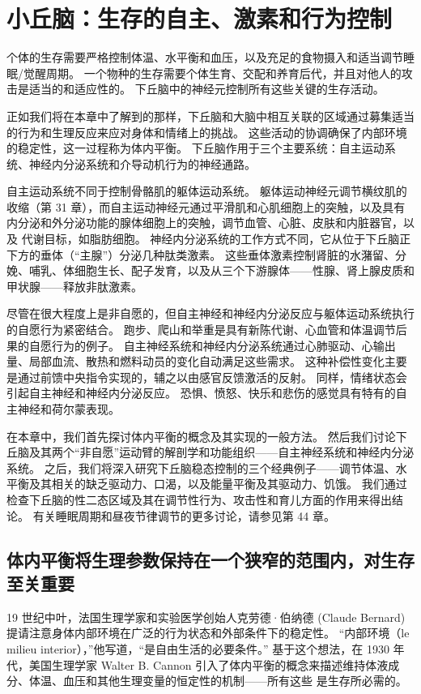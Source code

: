 \chapter{小丘脑：生存的自主、激素和行为控制} \label{chap:chap41}
个体的生存需要严格控制体温、水平衡和血压，以及充足的食物摄入和适当调节睡眠/觉醒周期。 一个物种的生存需要个体生育、交配和养育后代，并且对他人的攻击是适当的和适应性的。 下丘脑中的神经元控制所有这些关键的生存活动。

正如我们将在本章中了解到的那样，下丘脑和大脑中相互关联的区域通过募集适当的行为和生理反应来应对身体和情绪上的挑战。 这些活动的协调确保了内部环境的稳定性，这一过程称为体内平衡。 下丘脑作用于三个主要系统：自主运动系统、神经内分泌系统和介导动机行为的神经通路。

自主运动系统不同于控制骨骼肌的躯体运动系统。 躯体运动神经元调节横纹肌的收缩（第 31 章），而自主运动神经元通过平滑肌和心肌细胞上的突触，以及具有内分泌和外分泌功能的腺体细胞上的突触，调节血管、心脏、皮肤和内脏器官，以及 代谢目标，如脂肪细胞。 神经内分泌系统的工作方式不同，它从位于下丘脑正下方的垂体（“主腺”）分泌几种肽类激素。 这些垂体激素控制肾脏的水潴留、分娩、哺乳、体细胞生长、配子发育，以及从三个下游腺体——性腺、肾上腺皮质和甲状腺——释放非肽激素。

尽管在很大程度上是非自愿的，但自主神经和神经内分泌反应与躯体运动系统执行的自愿行为紧密结合。 跑步、爬山和举重是具有新陈代谢、心血管和体温调节后果的自愿行为的例子。 自主神经系统和神经内分泌系统通过心肺驱动、心输出量、局部血流、散热和燃料动员的变化自动满足这些需求。 这种补偿性变化主要是通过前馈中央指令实现的，辅之以由感官反馈激活的反射。 同样，情绪状态会引起自主神经和神经内分泌反应。 恐惧、愤怒、快乐和悲伤的感觉具有特有的自主神经和荷尔蒙表现。

在本章中，我们首先探讨体内平衡的概念及其实现的一般方法。 然后我们讨论下丘脑及其两个“非自愿”运动臂的解剖学和功能组织——自主神经系统和神经内分泌系统。 之后，我们将深入研究下丘脑稳态控制的三个经典例子——调节体温、水平衡及其相关的缺乏驱动力、口渴，以及能量平衡及其驱动力、饥饿。 我们通过检查下丘脑的性二态区域及其在调节性行为、攻击性和育儿方面的作用来得出结论。 有关睡眠周期和昼夜节律调节的更多讨论，请参见第 44 章。

\section{体内平衡将生理参数保持在一个狭窄的范围内，对生存至关重要}

19 世纪中叶，法国生理学家和实验医学创始人克劳德·伯纳德 (Claude Bernard) 提请注意身体内部环境在广泛的行为状态和外部条件下的稳定性。 “内部环境（le milieu interior），”他写道，“是自由生活的必要条件。” 基于这个想法，在 1930 年代，美国生理学家 Walter B. Cannon 引入了体内平衡的概念来描述维持体液成分、体温、血压和其他生理变量的恒定性的机制——所有这些 是生存所必需的。

